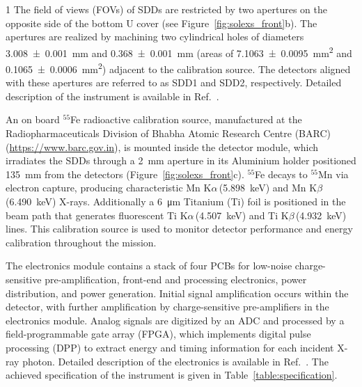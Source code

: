 \documentclass[12pt]{spieman}  %
\begin{document}
\begin{spacing}{1}
The field of views (FOVs) of SDDs are restricted by two apertures on the opposite side of the bottom U cover (see Figure~\ref{fig:solexs_front}b). The apertures are realized by machining two cylindrical holes of diameters \SI{3.008\pm 0.001}{\milli\metre} and \SI{0.368\pm 0.001}{\milli\metre} (areas of \SI{7.1063 \pm 0.0095}{\square\milli\metre} and \SI{0.1065 \pm 0.0006}{\square\milli\metre}) adjacent to the calibration source. The detectors aligned with these apertures are referred to as SDD1 and SDD2, respectively. Detailed description of the instrument is available in Ref.~.


An on board $^{55}$Fe radioactive calibration source, manufactured at the Radiopharmaceuticals Division of Bhabha Atomic Research Centre (BARC) (\url{https://www.barc.gov.in}), is mounted inside the detector module, which irradiates the SDDs through a \SI{2}{\milli\metre} aperture in its Aluminium  holder positioned \SI{135}{\milli\metre} from the detectors (Figure~\ref{fig:solexs_front}c). $^{55}$Fe decays to $^{55}$Mn via electron capture, producing characteristic Mn K$\alpha$\,(\SI{5.898}{\keV}) and Mn K$\beta$\,(\SI{6.490}{\keV}) X-rays. 
Additionally a \SI{6}{\micro\metre} Titanium (Ti) foil is positioned in the beam path that generates fluorescent Ti K$\alpha$\,(\SI{4.507}{\keV}) and Ti K$\beta$\,(\SI{4.932}{\keV}) lines. This calibration source is used to monitor detector performance and energy calibration throughout the mission.


The electronics module contains a stack of four PCBs for low-noise charge-sensitive pre-amplification, front-end and processing electronics, power distribution, and power generation. Initial signal amplification occurs within the detector, with further amplification by charge-sensitive pre-amplifiers in the electronics module. Analog signals are digitized by an ADC and processed by a field-programmable gate array (FPGA), which implements digital pulse processing (DPP) to extract energy and timing information for each incident X-ray photon. Detailed description of the electronics is available in Ref.~. The achieved specification of the instrument is given in Table~\ref{table:specification}.




\end{spacing}
\end{document}
